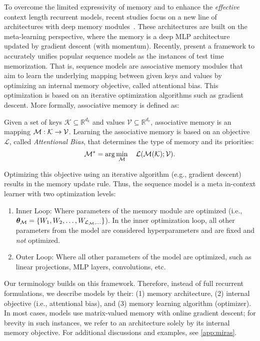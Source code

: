 To overcome the limited expressivity of memory and to enhance the \emph{effective} context length recurrent models, recent studies focus on a new line of architectures with deep memory modules~\citep{irie2021going, sun2024learning, behrouz2024titans, behrouz2025Miras}. These architectures are built on the meta-learning perspective, where the memory is a deep MLP architecture updated by gradient descent (with momentum). Recently, \citet{behrouz2025Miras} present a framework to accurately unifies popular sequence models as the instances of test time memorization. That is, sequence models are associative memory modules that aim to learn the underlying mapping between given keys and values by optimizing an internal memory objective, called attentional bias. This optimization is based on an iterative optimization algorithms such as gradient descent. More formally, associative memory is defined as:
\begin{dfn} \label{dfn:associative-memory}
Given a set of keys $\mathcal{K} \subseteq \mathbb{R}^{d_k}$ and values $\mathcal{V} \subseteq \mathbb{R}^{d_v}$, associative memory is an mapping $\mathcal{M}: \mathcal{K} \rightarrow \mathcal{V}$. Learning the associative memory is based on an objective $\mathcal{L}$, called \emph{Attentional Bias}, that determines the type of memory and its priorities:
\begin{align}\label{eq:attentional-bias-loss}
    \mathcal{M}^* = \arg\min_{\mathcal{M}}\quad \mathcal{L}(\mathcal{M}(\mathcal{K}); \mathcal{V}).
\end{align}
\end{dfn}
Optimizing this objective using an iterative algorithm (e.g., gradient descent) results in the memory update rule. Thus, the sequence model is a meta in-context learner with two  optimization levels:
\begin{enumerate}
    \item \textcolor{c4}{Inner Loop}: Where parameters of the memory module are optimized (i.e., $\boldsymbol{\theta}_{\mathcal{M}} = \{W_1, W_2, \dots, W_{\mathcal{L}_{\mathcal{M}}, \dots}\}$). In the inner optimization loop, all other parameters from the model are considered hyperparameters and are fixed and \emph{not} optimized.   
    \item \textcolor{c4}{Outer Loop}: Where all other parameters of the model are optimized, such as linear projections, MLP layers, convolutions, etc. 
\end{enumerate}
Our terminology builds on this framework. Therefore, instead of full recurrent formulations, we describe models by their: (1) memory architecture, (2) internal objective (i.e., attentional bias), and (3) memory learning algorithm (optimizer). In most cases, models use matrix-valued memory with online gradient descent; for brevity in such instances, we refer to an architecture solely by its internal memory objective. For additional discussions and examples, see \autoref{app:miras}.


